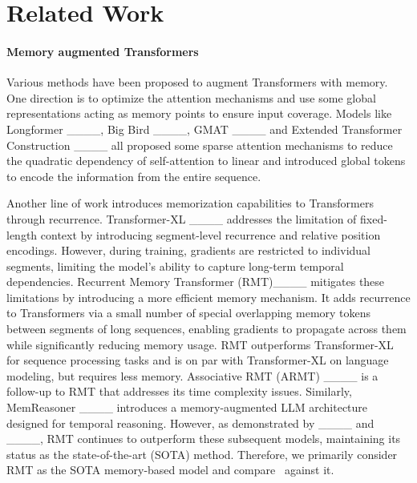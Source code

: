 \section{Related Work}
\paragraph{Memory augmented Transformers}
Various methods have been proposed to augment Transformers with memory. One direction is to optimize the attention mechanisms and use some global representations acting as memory points to ensure input coverage. Models like Longformer ____, Big Bird ____, GMAT ____ and Extended Transformer Construction ____ all proposed some sparse attention mechanisms to reduce the quadratic dependency of self-attention to linear and introduced global tokens to encode the information from the entire sequence.

Another line of work introduces memorization capabilities to Transformers through recurrence. Transformer-XL ____ addresses the limitation of fixed-length context by introducing segment-level recurrence and relative position encodings. 
However, during training, gradients are restricted to individual segments, limiting the model's ability to capture long-term temporal dependencies. 
Recurrent Memory Transformer (RMT)____ mitigates these limitations by introducing a more efficient memory mechanism. It adds recurrence to Transformers via a small number of special overlapping memory tokens between segments of long sequences, enabling gradients to propagate across them while significantly reducing memory usage. 
RMT outperforms Transformer-XL for sequence processing tasks and is on par with Transformer-XL on language modeling, but requires less memory.
Associative RMT (ARMT) ____ is a follow-up to RMT that addresses its time complexity issues. 
Similarly, MemReasoner ____ introduces a memory-augmented LLM architecture designed for temporal reasoning. However, as demonstrated by ____ and ____, RMT continues to outperform these subsequent models, maintaining its status as the state-of-the-art (SOTA) method. 
Therefore, we primarily consider RMT as the SOTA memory-based model and compare \name\ against it.

